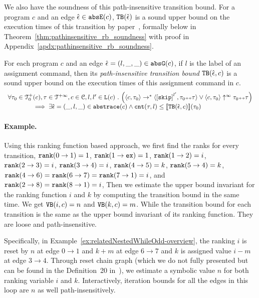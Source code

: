 We also have the soundness of this path-insensitive transition bound. For a program $c$ and an edge $\hat{\mathtt{\epsilon}{}} \in \mathtt{abs}{\mathtt{E}}(c)$,
${\mathtt{TB}}(\hat{\mathtt{\epsilon}{}})$ is a sound upper bound
on the execution times of this transition by paper~\cite{SinnZV17}, formally below in Theorem~\ref{thm:pathinsensitive_rb_soundness} with proof in Appendix~\ref{apdx:pathinsensitive_rb_soundness}.
%
\begin{thm}
  \label{thm:pathinsensitive_rb_soundness}
For each program ${c}$ and an edge $\hat{\mathtt{\epsilon}{}} = (l, \_, \_) \in \mathtt{abs}{\mathtt{G}}(c)$, if $l$ is the label of an assignment command,
then its \emph{path-insensitive transition bound} ${\mathtt{TB}}(\hat{\mathtt{\epsilon}{}}, c)$ 
 is a sound upper bound on 
the execution times of this assignment command in $c$.
  \[
    \begin{array}{l}
      \forall \trace_0 \in \ftdom_0(c), \trace \in \tdom, c \in \cdom, l, l' \in \lvar(c) \st
      \Big( \config{c, \trace_0} \rightarrow^{*} \config{\clabel{\eskip}^{l'}, \trace_0 \tracecat \trace} 
        \lor  \config{c, \trace_0} \uparrow^{\infty} \trace_0 \tracecat \trace \Big)
       \\ \qquad \qquad
       \implies
       \exists \absevent = (\_, l, \_) \in \absflow(c) \land
      \counter(\trace, l) \leq \econfig{\absclr(\absevent, c)}(\trace_0)
    \end{array}
  \]
\end{thm}
%
\paragraph[example]{Example.}
Using this ranking function based approach, we first find the ranks for every transition,
$\mathtt{rank}(0 \to 1) = 1$,
$\mathtt{rank}(1 \to \mathtt{ex}) = 1$,
$\mathtt{rank}(1 \to 2) = i$,
$\mathtt{rank}(2 \to 3) = i$,
$\mathtt{rank}(3 \to 4) = i$,
$\mathtt{rank}(4 \to 5) = k$,
$\mathtt{rank}(5 \to 4) = k$,
$\mathtt{rank}(4\to 6) = \mathtt{rank}(6 \to 7) = \mathtt{rank}(7 \to 1) = i$,
and $\mathtt{rank}(2 \to 8) = \mathtt{rank}(8 \to 1) = i$,
Then we estimate the upper bound invariant for the ranking function $i$ and $k$ by computing the transition bound in the same time.
We get ${\mathtt{VB}}(i, c) = n$ and ${\mathtt{VB}}(k, c) = m$.
While the transition bound for each transition is the same as the upper bound invariant of its ranking function.
They are loose and path-insensitive. 

Specifically, in Example~\ref{ex:relatedNestedWhileOdd-overview}, the ranking $i$ is reset by $n$ at edge $0 \to 1$ and 
$k + m$ at edge $6 \to 7$ and $k$ is assigned value $i - m$ at edge $3 \to 4$. Through reset chain graph (which we do not fully presented but can be found in the Definition~20 in~\cite{SinnZV17}), we estimate a symbolic value $n$ for both ranking variable $i$ and $k$.
Interactively, iteration bounds for all the edges in this loop are $n$ as well path-insensitively.